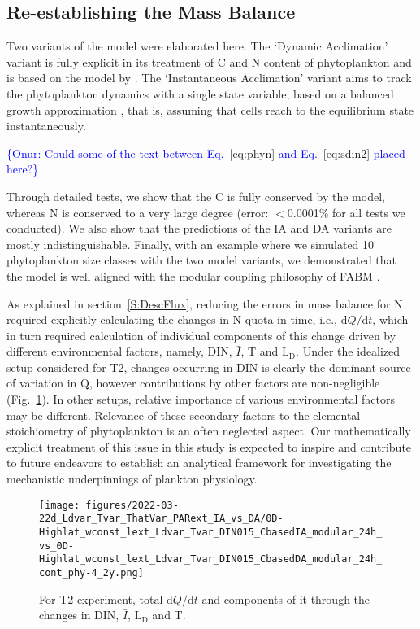 \documentclass[gmd, manuscript]{copernicus}
\newcommand{\onur}[1]{\textcolor{blue}{\{Onur: #1\}}}
\begin{document}
\subsection{Re-establishing the Mass Balance}

Two variants of the model were elaborated here. The `Dynamic Acclimation' variant is fully explicit in its treatment of C and N content of phytoplankton and is based on the model by \citet{Pahlowetal13}. The `Instantaneous Acclimation' variant aims to track the phytoplankton dynamics with a single state variable, based on a balanced growth approximation \citep{Burmaster1979}, that is, assuming that cells reach to the equilibrium state instantaneously. 

\onur{Could some of the text between Eq.~\ref{eq:phyn} and Eq.~\ref{eq:sdin2} placed here?}

Through detailed tests, we show that the C is fully conserved by the model, whereas N is conserved to a very large degree (error: $<$0.0001\% for all tests we conducted). We also show that the predictions of the IA and DA variants are mostly indistinguishable. Finally, with an example where we simulated 10 phytoplankton size classes with the two model variants, we demonstrated that the model is well aligned with the modular coupling philosophy of FABM \citep{Bruggeman2014}.  

As explained in section~\ref{S:DescFlux}, reducing the errors in mass balance for N required explicitly calculating the changes in N quota in time, i.e., $\textrm{d}Q/\textrm{d}t$, which in turn required calculation of individual components of this change driven by different environmental factors, namely, DIN, $\bar{I}$, T and $\textrm{L}_{\textrm{D}}$.  Under the idealized setup considered for T2, changes occurring in DIN is clearly the dominant source of variation in Q, however contributions by other factors are non-negligible (Fig.~\ref{f.T2dQdt}). In other setups, relative importance of various environmental factors may be different. Relevance of these secondary factors to the elemental stoichiometry of phytoplankton is an often neglected aspect. Our mathematically explicit treatment of this issue in this study is expected to inspire and contribute to future endeavors to establish an analytical framework for investigating the mechanistic underpinnings of plankton physiology.

\begin{figure}[ht!]
\texttt{[image: figures/2022-03-22d\_Ldvar\_Tvar\_ThatVar\_PARext\_IA\_vs\_DA/0D-Highlat\_wconst\_lext\_Ldvar\_Tvar\_DIN015\_CbasedIA\_modular\_24h\_vs\_0D-Highlat\_wconst\_lext\_Ldvar\_Tvar\_DIN015\_CbasedDA\_modular\_24h\_cont\_phy-4\_2y.png]}
\caption{For T2 experiment, total $\textrm{d}Q/\textrm{d}t$ and components of it through the changes in DIN, $\bar{I}$, $\textrm{L}_{\textrm{D}}$ and T.\label{f.T2dQdt}}
\end{figure}
\end{document}
